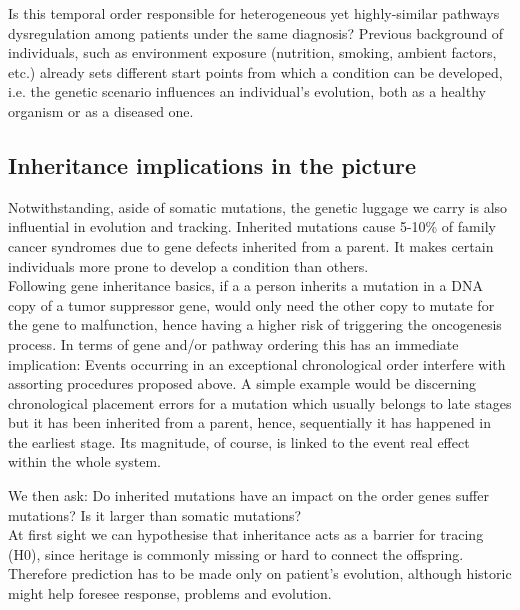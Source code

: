 Is this temporal order responsible for heterogeneous yet highly-similar pathways dysregulation among patients under the same diagnosis?
Previous background of individuals, such as environment exposure (nutrition, smoking, ambient factors, etc.) \cite{Jung2007EnvironmentalGenome} already sets different start points from which a condition can be developed, i.e. the genetic scenario influences an individual’s evolution, both as a healthy organism or as a diseased one.
\\

\subsection{Inheritance implications in the picture}

Notwithstanding, aside of somatic mutations, the genetic luggage we carry is also influential in evolution and tracking. Inherited mutations cause 5-10\% of family cancer syndromes due to gene defects inherited from a parent. It makes certain individuals more prone to develop a condition than others.
\\

Following gene inheritance basics, if a a person inherits a mutation in a DNA copy of a tumor suppressor gene, would only need the other copy to mutate for the gene to malfunction, hence having a higher risk of triggering the oncogenesis process. In terms of gene and/or pathway ordering this has an immediate implication: Events occurring in an exceptional chronological order interfere with assorting procedures proposed above. A simple example would be discerning chronological placement errors for a mutation which usually belongs to late stages but it has been inherited from a parent, hence, sequentially it has happened in the earliest stage. Its magnitude, of course, is linked to the event real effect within the whole system.

We then ask: Do inherited mutations have an impact on the order genes suffer mutations? Is it larger than somatic mutations?
\\

At first sight we can hypothesise that inheritance acts as a barrier for tracing (H0), since heritage is commonly missing or hard to connect the offspring. Therefore prediction has to be made only on patient’s evolution, although historic might help foresee response, problems and evolution.